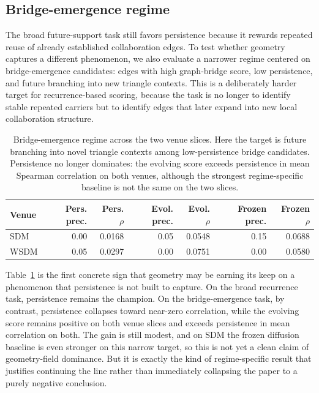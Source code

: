 \documentclass[11pt]{article}
\begin{document}
\subsection*{Bridge-emergence regime}
The broad future-support task still favors persistence because it rewards repeated reuse of already established collaboration edges. To test whether geometry captures a different phenomenon, we also evaluate a narrower regime centered on bridge-emergence candidates: edges with high graph-bridge score, low persistence, and future branching into new triangle contexts. This is a deliberately harder target for recurrence-based scoring, because the task is no longer to identify stable repeated carriers but to identify edges that later expand into new local collaboration structure.

\begin{table}[t]
\centering
\begin{tabular}{lrrrrrr}
\toprule
Venue & Pers. prec. & Pers. $\rho$ & Evol. prec. & Evol. $\rho$ & Frozen prec. & Frozen $\rho$ \\
\midrule
SDM & 0.00 & 0.0168 & 0.05 & 0.0548 & 0.15 & 0.0688 \\
WSDM & 0.05 & 0.0297 & 0.00 & 0.0751 & 0.00 & 0.0580 \\
\bottomrule
\end{tabular}
\caption{Bridge-emergence regime across the two venue slices. Here the target is future branching into novel triangle contexts among low-persistence bridge candidates. Persistence no longer dominates: the evolving score exceeds persistence in mean Spearman correlation on both venues, although the strongest regime-specific baseline is not the same on the two slices.}
\label{tab:bridge-regime}
\end{table}

Table~\ref{tab:bridge-regime} is the first concrete sign that geometry may be earning its keep on a phenomenon that persistence is not built to capture. On the broad recurrence task, persistence remains the champion. On the bridge-emergence task, by contrast, persistence collapses toward near-zero correlation, while the evolving score remains positive on both venue slices and exceeds persistence in mean correlation on both. The gain is still modest, and on SDM the frozen diffusion baseline is even stronger on this narrow target, so this is not yet a clean claim of geometry-field dominance. But it is exactly the kind of regime-specific result that justifies continuing the line rather than immediately collapsing the paper to a purely negative conclusion.
\end{document}
